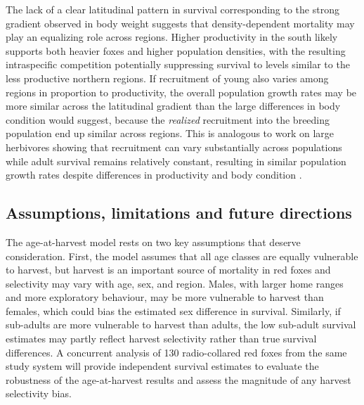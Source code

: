 \documentclass[12pt,a4paper,final,abstract=true,headings=small]{scrartcl}
\begin{document}
The lack of a clear latitudinal pattern in survival corresponding to the strong gradient observed in body weight suggests that density-dependent mortality may play an equalizing role across regions. Higher productivity in the south likely supports both heavier foxes and higher population densities, with the resulting intraspecific competition potentially suppressing survival to levels similar to the less productive northern regions. If recruitment of young also varies among regions in proportion to productivity, the overall population growth rates may be more similar across the latitudinal gradient than the large differences in body condition would suggest, because the \emph{realized} recruitment into the breeding population  end up similar across regions. This is analogous to work on large herbivores showing that recruitment can vary substantially across populations while adult survival remains relatively constant, resulting in similar population growth rates despite differences in productivity and body condition \citep{gaillardTemporalVariationFitness2000}.

\subsection*{Assumptions, limitations and future directions}

The age-at-harvest model rests on two key assumptions that deserve
consideration. First, the model assumes that all age classes are equally
vulnerable to harvest, but harvest is an important source of mortality in
red foxes and selectivity may vary with age, sex, and region. Males, with
larger home ranges and more exploratory behaviour, may be more vulnerable
to harvest than females, which could bias the estimated sex difference in
survival. Similarly, if sub-adults are more vulnerable to harvest than
adults, the low sub-adult survival estimates may partly reflect harvest
selectivity rather than true survival differences. A concurrent analysis
of 130 radio-collared red foxes from the same study system will provide
independent survival estimates to evaluate the robustness of the
age-at-harvest results and assess the magnitude of any harvest selectivity
bias.
\end{document}
